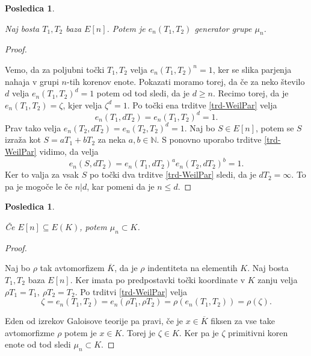 \documentclass[12pt,a4paper,twoside]{article}
\theoremstyle{definition} %
\theoremstyle{plain} %
\newtheorem{posledica}[definicija]{Posledica}
\numberwithin{equation}{section}  %
\newcommand{\N}{\mathbb N}
\newcommand{\E}[1]{E({#1})}
\begin{document}
\begin{posledica}~

\label{PosledicaTrdParj}
Naj bosta $T_1,T_2$ baza $E[n]$. Potem je $e_n(T_1,T_2)$ generator grupe $\mu_n$.
\end{posledica}

\begin{proof}~

Vemo, da za poljubni točki $T_1,T_2$ velja $e_n(T_1,T_2)^n = 1$, ker se slika parjenja nahaja v grupi $n$-tih korenov enote. Pokazati moramo torej, da če za neko število $d$ velja  $e_n(T_1,T_2)^d = 1$ potem od tod sledi, da je $d \geq n$.
Recimo torej, da je $e_n(T_1,T_2) = \zeta$, kjer velja $\zeta^d = 1$.
Po točki ena trditve \ref{trd-WeilPar} velja $$e_n(T_1,dT_2) = e_n(T_1,T_2)^d=1.$$ Prav tako velja $e_n(T_2,dT_2) = e_n(T_2,T_2)^d = 1 $. Naj bo $S \in E[n]$, potem se $S$ izraža kot $S = aT_1+bT_2$ za neka $a,b \in \N$.
S ponovno uporabo trditve \ref{trd-WeilPar} vidimo, da velja
$$e_n(S,dT_2)= e_n(T_1,dT_2)^ae_n(T_2,dT_2)^b = 1. $$
Ker to valja za vsak $S$ po točki dva trditve \ref{trd-WeilPar} sledi, da je $dT_2 = \infty$. To pa je mogoče le če $n|d$, kar pomeni da je $n \leq d$.
\end{proof}

\begin{posledica}~

Če $E[n] \subseteq \E{K}$, potem $\mu_n \subset K$.

\end{posledica}

\begin{proof}~

Naj bo $\rho$ tak avtomorfizem $\overline{K}$, da je $\rho$ indentiteta na elementih $K$. Naj bosta $T_1,T_2$ baza $E[n]$. Ker imata po predpostavki točki koordinate v $K$ zanju velja
$\rho T_1 = T_1, \ \rho T_2 = T_2$.
Po trditvi \ref{trd-WeilPar} velja
$$\zeta = e_n(T_1,T_2) = e_n(\rho T_1,\rho T_2) = \rho(e_n(T_1,T_2)) = \rho(\zeta).$$

Eden od izrekov Galoisove teorije pa pravi, če je $x \in \overline{K}$ fiksen za vse take avtomorfizme $\rho$ potem je $x\in K$. Torej je $\zeta \in K$. Ker pa je $\zeta$ primitivni koren enote od tod sledi $\mu_n \subset K$.

\end{proof}
\end{document}
